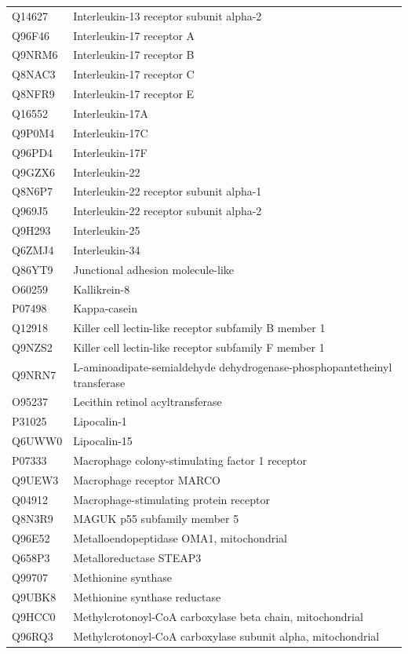 \documentclass[10pt,twoside]{article}
\begin{document}
\begin{longtable}{lL{0.75\textwidth}}
Q14627	&	Interleukin-13 receptor subunit alpha-2 	\\
Q96F46	&	Interleukin-17 receptor A 	\\
Q9NRM6	&	Interleukin-17 receptor B 	\\
Q8NAC3	&	Interleukin-17 receptor C 	\\
Q8NFR9	&	Interleukin-17 receptor E 	\\
Q16552	&	Interleukin-17A 	\\
Q9P0M4	&	Interleukin-17C 	\\
Q96PD4	&	Interleukin-17F 	\\
Q9GZX6	&	Interleukin-22 	\\
Q8N6P7	&	Interleukin-22 receptor subunit alpha-1 	\\
Q969J5	&	Interleukin-22 receptor subunit alpha-2 	\\
Q9H293	&	Interleukin-25 	\\
Q6ZMJ4	&	Interleukin-34 	\\
Q86YT9	&	Junctional adhesion molecule-like 	\\
O60259	&	Kallikrein-8 	\\
P07498	&	Kappa-casein	\\
Q12918	&	Killer cell lectin-like receptor subfamily B member 1 	\\
Q9NZS2	&	Killer cell lectin-like receptor subfamily F member 1 	\\
Q9NRN7	&	L-aminoadipate-semialdehyde dehydrogenase-phosphopantetheinyl transferase 	\\
O95237	&	Lecithin retinol acyltransferase 	\\
P31025	&	Lipocalin-1 	\\
Q6UWW0	&	Lipocalin-15	\\
P07333	&	Macrophage colony-stimulating factor 1 receptor 	\\
Q9UEW3	&	Macrophage receptor MARCO 	\\
Q04912	&	Macrophage-stimulating protein receptor 	\\
Q8N3R9	&	MAGUK p55 subfamily member 5	\\
Q96E52	&	Metalloendopeptidase OMA1, mitochondrial 	\\
Q658P3	&	Metalloreductase STEAP3 	\\
Q99707	&	Methionine synthase 	\\
Q9UBK8	&	Methionine synthase reductase 	\\
Q9HCC0	&	Methylcrotonoyl-CoA carboxylase beta chain, mitochondrial 	\\
Q96RQ3	&	Methylcrotonoyl-CoA carboxylase subunit alpha, mitochondrial 	\\

\end{longtable}
\end{document}
